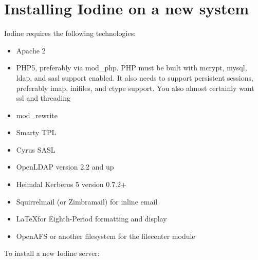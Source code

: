 \documentclass[11pt,letterpaper]{report}
\begin{document}
\section{Installing Iodine on a new system}
Iodine requires the following technologies:
\begin{itemize}
	\item Apache 2
	\item PHP5, preferably via mod\_php.
		PHP must be built with mcrypt, mysql, ldap, and sasl
		support enabled.  It also needs to support persistent
		sessions, preferably imap, inifiles, and ctype support.
		You also almost certainly want ssl and threading
	\item mod\_rewrite
	\item Smarty TPL
	\item Cyrus SASL
	\item OpenLDAP version 2.2 and up
	\item Heimdal Kerberos 5 version 0.7.2+
	\item Squirrelmail (or Zimbramail) for inline email
	\item \LaTeX for Eighth-Period formatting and display
	\item OpenAFS or another filesystem for the filecenter module
\end{itemize}
To install a new Iodine server:
\end{document}
